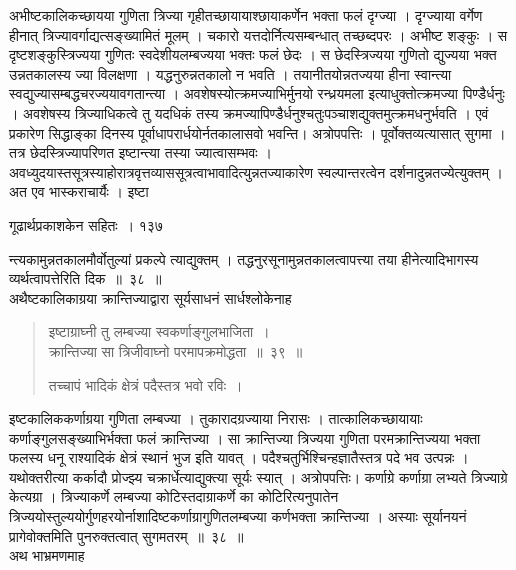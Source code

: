 \documentclass[11pt, openany]{book}
\begin{document}
\begin{sloppypar}
 अभीष्टकालिकच्छायया गुणिता त्रिज्या गृहीतच्छायायाश्छायाकर्णेन भक्ता फलं दृग्ज्या । दृग्ज्याया वर्गेण हीनात् त्रिज्यावर्गाद्यत्सङ्ख्यामितं मूलम् । चकारो यत्तदोर्नित्यसम्बन्धात् तच्छब्दपरः । अभीष्ट शङ्कुः । स दृष्टशङ्कुस्त्रिज्यया गुणितः स्वदेशीयलम्बज्यया भक्तः फलं छेदः । स छेदस्त्रिज्यया गुणितो द्युज्यया भक्त उन्नतकालस्य ज्या विलक्षणा । यद्धनुरुन्नतकालो न भवति । तयानीतयोन्नतज्यया हीना स्वान्त्या स्वद्युज्यासम्बद्धचरज्ययावगतान्त्या । अवशेषस्योत्क्रमज्याभिर्मुनयो रन्ध्रयमला इत्याधुक्तोत्क्रमज्या पिण्डैर्धनुः । अवशेषस्य त्रिज्याधिकत्वे तु यदधिकं तस्य क्रमज्यापिण्डैर्धनुश्चतुःपञ्चाशद्युक्तमुत्क्रमधनुर्भवति । एवं प्रकारेण सिद्धाङ्का दिनस्य पूर्वाधापरार्धयोर्नतकालासवो भवन्ति। अत्रोपपत्तिः । पूर्वोक्तव्यत्यासात् सुगमा । तत्र छेदस्त्रिज्यापरिणत इष्टान्त्या तस्या ज्यात्वासम्भवः । अवध्युदयास्तसूत्रस्याहोरात्रवृत्तव्याससूत्रत्वाभावादित्युन्नतज्याकारेण स्वल्पान्तरत्वेन दर्शनादुन्नतज्येत्युक्तम् । अत एव भास्कराचार्यैः । इष्टा\textendash
\end{sloppypar}




\newpage

\hspace{3cm}  गूढार्थप्रकाशकेन सहितः~। \hfill १३७
\vspace{1cm}

\begin{sloppypar}
न्त्यकामुन्नतकालमौर्वोतुल्यां प्रकल्पे त्याद्युक्तम् । तद्धनुरसूनामुन्नतकालत्वापत्त्या तया हीनेत्यादिभागस्य व्यर्थत्वापत्तेरिति दिक~॥~३८~॥\\
अथैष्टकालिकाग्रया क्रान्तिज्याद्वारा सूर्यसाधनं सार्धश्लोकेनाह\textendash
\end{sloppypar}


\begin{quote}
{\ssi इष्टाग्राघ्नी तु लम्बज्या स्वकर्णाङ्गुलभाजिता~।\\
 क्रान्तिज्या सा त्रिजीवाघ्नो परमापक्रमोद्धता~॥~३९~॥
 
 तच्चापं भादिकं क्षेत्रं पदैस्तत्र भवो रविः~।}
 \end{quote}

\begin{sloppypar}
 इष्टकालिककर्णाग्रया गुणिता लम्बज्या । तुकारादग्रज्याया निरासः । तात्कालिकच्छायायाः कर्णाङ्गुलसङ्ख्याभिर्भक्ता फलं क्रान्तिज्या । सा क्रान्तिज्या त्रिज्यया गुणिता परमक्रान्तिज्यया भक्ता फलस्य धनू राश्यादिकं क्षेत्रं स्थानं भुज इति यावत् । पदैश्चतुर्भिश्चिन्हज्ञातैस्तत्र पदे भव उत्पन्नः । यथोक्तरीत्या कर्कादौ प्रोज्झ्य चक्रार्धेत्याद्युक्त्या सूर्यः स्यात् । अत्रोपपत्तिः। कर्णाग्रे कर्णाग्रा लभ्यते त्रिज्याग्रे केत्यग्रा । त्रिज्याकर्णे लम्बज्या कोटिस्तदाग्राकर्णे का कोटिरित्यनुपातेन त्रिज्ययोस्तुल्ययोर्गुणहरयोर्नाशादिष्टकर्णाग्रागुणितलम्बज्या कर्णभक्ता क्रान्तिज्या । अस्याः सूर्यानयनं प्रागेवोक्तमिति पुनरुक्तत्वात् सुगमतरम्~॥~३८~॥\\
 \noindent अथ भाभ्रमणमाह\textendash
\end{sloppypar}
\end{document}
